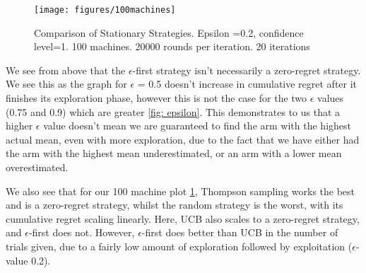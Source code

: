\begin{figure}[!h]
    \centering
    \texttt{[image: figures/100machines]}
    \caption[Comparison for 100 machines]{Comparison of Stationary Strategies. Epsilon =0.2, confidence level=1. 100 machines. 20000 rounds per iteration. 20 iterations}
    \label{fig: all4}
\end{figure}

We see from above that the $\epsilon$-first strategy isn't necessarily a zero-regret strategy. We see this as the graph for $\epsilon$ = 0.5 doesn't increase in cumulative regret after it finishes its exploration phase, however this is not the case for the two $\epsilon$ values (0.75 and 0.9) which are greater \ref{fig: epsilon}. This demonstrates to us that a higher $\epsilon$ value doesn't mean we are guaranteed to find the arm with the highest actual mean, even with more exploration, due to the fact that we have either had the arm with the highest mean underestimated, or an arm with a lower mean overestimated.

We also see that for our 100 machine plot \ref{fig: all4}, Thompson sampling works the best and is a zero-regret strategy, whilst the random strategy is the worst, with its cumulative regret scaling linearly. Here, UCB also scales to a zero-regret strategy, and $\epsilon$-first does not. However, $\epsilon$-first does better than UCB in the number of trials given, due to a fairly low amount of exploration followed by exploitation ($\epsilon$-value 0.2).